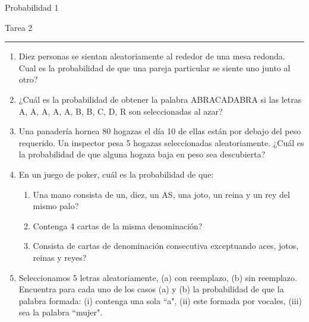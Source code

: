 \documentclass{report}
\begin{document}
\begin{center}
    \textsf{\Large Probabilidad 1}
    \par\medskip
    \textsf{\large Tarea 2}
    \end{center}
    \hrule
    \par\bigskip

\begin{enumerate}
    \item Diez personas se sientan aleatoriamente al rededor de una mesa
      redonda. Cual es la probabilidad de que una pareja particular se
      siente uno junto al otro?
    \item ¿Cuál es la probabilidad de obtener la palabra ABRACADABRA si las letras A, A, A, A, A, B, B, C, D, R son seleccionadas al azar? 
        \item Una panadería hornea 80 hogazas el día 10 de ellas están por debajo del peso requerido. Un inspector pesa 5 hogazas seleccionadas aleatoriamente. ¿Cuál es la probabilidad de que alguna hogaza baja en peso sea descubierta?
        \item En un juego de poker, cuál es la probabilidad de que:
        \begin{enumerate}
            \item Una mano consista de un, diez, un AS, una joto, un reina y un rey del mismo palo?
            \item Contenga 4 cartas de la misma denominación?
            \item Consista de cartas de denominación consecutiva exceptuando aces, jotos, reinas y reyes?
        \end{enumerate} 
        \item Seleccionamos 5 letras aleatoriamente, (a) con reemplazo, (b) sin reemplazo. Encuentra para cada uno de los casos (a) y (b) la probabilidad de que la palabra formada: (i) contenga una sola ``a", (ii) este formada por vocales, (iii) sea la palabra ``mujer".  
\end{enumerate}
\end{document}
